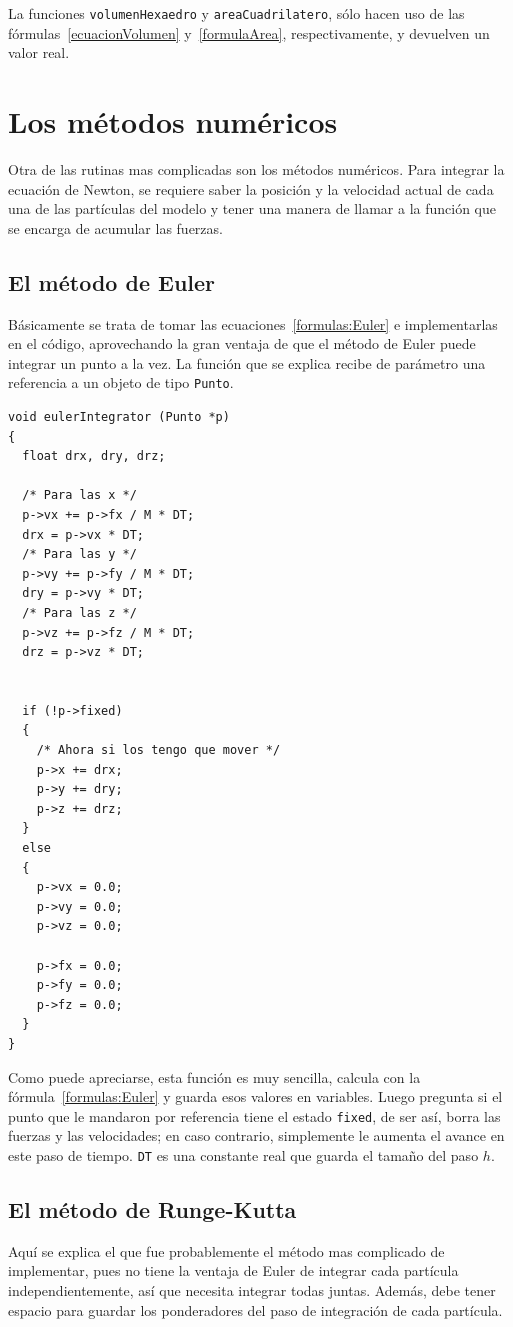 La funciones \verb|volumenHexaedro| y \verb|areaCuadrilatero|, sólo hacen uso de las fórmulas~\ref{ecuacionVolumen} y~\ref{formulaArea}, respectivamente, y devuelven un valor real.

\section{Los métodos numéricos}
Otra de las rutinas mas complicadas son los métodos numéricos.
Para integrar la ecuación de Newton, se requiere saber la posición y la velocidad actual de cada una de las partículas del modelo y tener una manera de llamar a la función que se encarga de acumular las fuerzas.

\subsection{El método de Euler}
Básicamente se trata de tomar las ecuaciones~\ref{formulas:Euler} e implementarlas en el código, aprovechando la gran ventaja de que el método de Euler puede integrar un punto a la vez.
La función que se explica recibe de parámetro una referencia a un objeto de tipo \verb|Punto|.
\begin{verbatim}
void eulerIntegrator (Punto *p)
{
  float drx, dry, drz;

  /* Para las x */
  p->vx += p->fx / M * DT;
  drx = p->vx * DT;
  /* Para las y */
  p->vy += p->fy / M * DT;
  dry = p->vy * DT;
  /* Para las z */
  p->vz += p->fz / M * DT;
  drz = p->vz * DT;


  if (!p->fixed)
  {
    /* Ahora si los tengo que mover */
    p->x += drx;
    p->y += dry;
    p->z += drz;
  }
  else
  {
    p->vx = 0.0;
    p->vy = 0.0;
    p->vz = 0.0;

    p->fx = 0.0;
    p->fy = 0.0;
    p->fz = 0.0;
  }
}
\end{verbatim} 
Como puede apreciarse, esta función es muy sencilla, calcula con la fórmula~\ref{formulas:Euler} y guarda esos valores en variables.
Luego pregunta si el punto que le mandaron por referencia tiene el estado \verb|fixed|, de ser así, borra las fuerzas y las velocidades; en caso contrario, simplemente le aumenta el avance en este paso de tiempo. \verb|DT| es una constante real que guarda el tamaño del paso $h$.

\subsection{El método de Runge-Kutta}
Aquí se explica el que fue probablemente el método mas complicado de implementar, pues no tiene la ventaja de Euler de integrar cada partícula independientemente, así que necesita integrar todas juntas.
Además, debe tener espacio para guardar los ponderadores del paso de integración de cada partícula.

